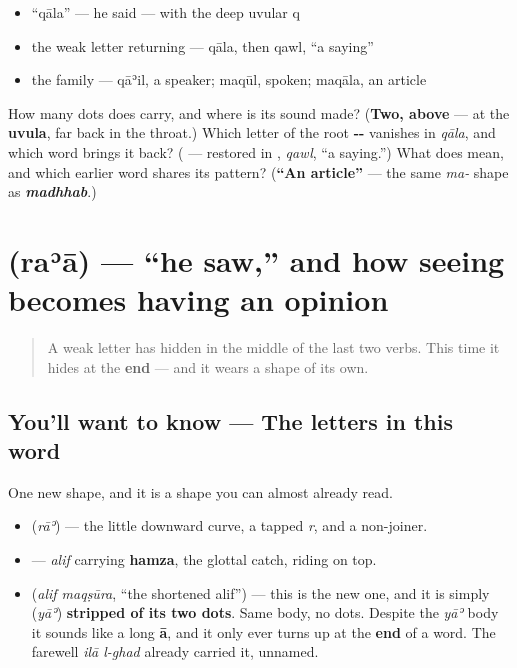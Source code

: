 \begin{itemize}
\raggedright
  \item \textquotedblleft{}qāla\textquotedblright{} — he said — with the deep uvular q
  \item the weak letter returning — qāla, then qawl, \textquotedblleft{}a saying\textquotedblright{}
  \item the family — qāʾil, a speaker; maqūl, spoken; maqāla, an article
\end{itemize}

\begin{tcolorbox}[breakable,colback=teal!4,colframe=teal!35!black,title={Before you move on}]
How many dots does \textbf{} carry, and where is its sound made? (\textbf{Two, above} — at the \textbf{uvula}, far back in the throat.) Which letter of the root \textbf{--} vanishes in \emph{qāla}, and which word brings it back? (\textbf{} — restored in \textbf{}, \emph{qawl}, \textquotedblleft{}a saying.\textquotedblright{}) What does \textbf{} mean, and which earlier word shares its pattern? (\textbf{\textquotedblleft{}An article\textquotedblright{}} — the same \emph{ma-} shape as \emph{\textbf{madhhab}}.)
\end{tcolorbox}
\section[\texorpdfstring{\ar{رأى} (raʾā)}{رأى (raʾā)}]{ (raʾā) — \textquotedblleft{}he saw,\textquotedblright{} and how seeing becomes having an opinion}

\label{lesson:AR-C29-raa}



\begin{quote}
A weak letter has hidden in the middle of the last two verbs. This time it hides at the \textbf{end} — and it wears a shape of its own.
\end{quote}

\subsection*{You'll want to know — The letters in this word}
One new shape, and it is a shape you can almost already read.

\begin{itemize}
\raggedright
  \item \textbf{} (\emph{rāʾ}) — the little downward curve, a tapped \emph{r}, and a non-joiner.
  \item \textbf{} — \emph{alif} carrying \textbf{hamza}, the glottal catch, riding on top.
  \item \textbf{} (\emph{alif maqṣūra}, \textquotedblleft{}the shortened alif\textquotedblright{}) — this is the new one, and it is simply \textbf{} (\emph{yāʾ}) \textbf{stripped of its two dots}. Same body, no dots. Despite the \emph{yāʾ} body it sounds like a long \textbf{ā}, and it only ever turns up at the \textbf{end} of a word. The farewell \emph{ilā l-ghad} already carried it, unnamed.
\end{itemize}

